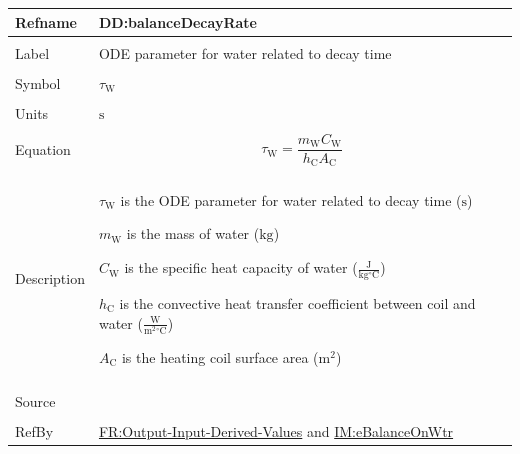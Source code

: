 \documentclass[12pt]{article}
\begin{document}
\vspace{\baselineskip}
\noindent
\begin{minipage}{\textwidth}
\begin{tabular}{>{\raggedright}p{}>{\raggedright\arraybackslash}p{}}
\toprule \textbf{Refname} & \textbf{DD:balanceDecayRate}
\label{DD:balanceDecayRate}
\\ \midrule \\
Label & ODE parameter for water related to decay time
        
\\ \midrule \\
Symbol & ${τ_{\text{W}}}$
         
\\ \midrule \\
Units & ${\text{s}}$
        
\\ \midrule \\
Equation & \begin{displaymath}
           {τ_{\text{W}}}=\frac{{m_{\text{W}}} {C_{\text{W}}}}{{h_{\text{C}}} {A_{\text{C}}}}
           \end{displaymath}
\\ \midrule \\
Description & \begin{symbDescription}
              \item{${τ_{\text{W}}}$ is the ODE parameter for water related to decay time (${\text{s}}$)}
              \item{${m_{\text{W}}}$ is the mass of water (${\text{kg}}$)}
              \item{${C_{\text{W}}}$ is the specific heat capacity of water ($\frac{\text{J}}{\text{kg}{}^{\circ}\text{C}}$)}
              \item{${h_{\text{C}}}$ is the convective heat transfer coefficient between coil and water ($\frac{\text{W}}{\text{m}^{2}{}^{\circ}\text{C}}$)}
              \item{${A_{\text{C}}}$ is the heating coil surface area (${\text{m}^{2}}$)}
              \end{symbDescription}
\\ \midrule \\
Source & \cite{koothoor2013}
         
\\ \midrule \\
RefBy & \hyperref[outputInputDerivVals]{FR:Output-Input-Derived-Values} and \hyperref[IM:eBalanceOnWtr]{IM:eBalanceOnWtr}
        
\\ \bottomrule
\end{tabular}
\end{minipage}
\end{document}
